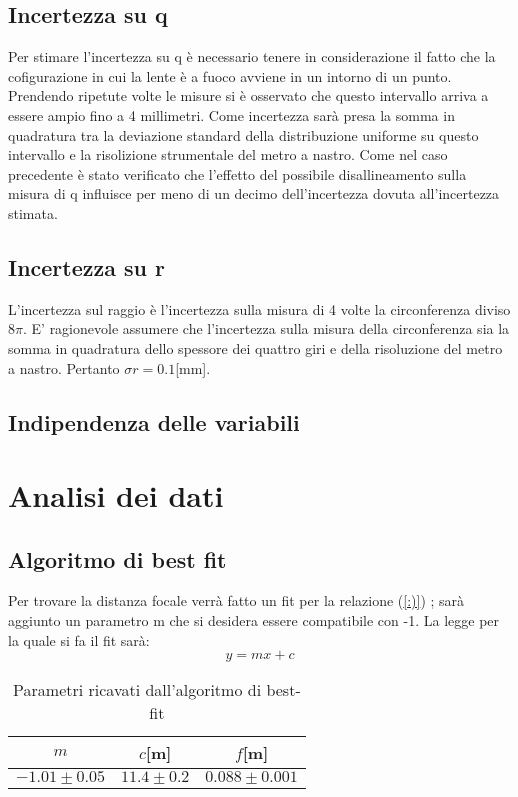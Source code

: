 \documentclass{article}
\begin{document}
\subsection{Incertezza su q}

Per stimare l'incertezza su q è necessario tenere in considerazione il fatto che la cofigurazione in cui la lente è a fuoco avviene in un intorno di un punto.
Prendendo ripetute volte le misure si è osservato che questo intervallo arriva a essere ampio fino a 4 millimetri.
Come incertezza sarà presa la somma in quadratura tra la deviazione standard della distribuzione uniforme su questo intervallo e la risolizione strumentale del metro a nastro.
Come nel caso precedente è stato verificato che l'effetto del possibile disallineamento sulla misura di q influisce per meno di un decimo dell'incertezza dovuta all'incertezza stimata.

\subsection{Incertezza su r}
L'incertezza sul raggio è l'incertezza sulla misura di 4 volte la circonferenza diviso $8\pi$.
E' ragionevole assumere che l'incertezza sulla misura della circonferenza sia la somma in quadratura dello spessore dei quattro giri e della risoluzione del metro a nastro.
Pertanto $\sigma r= 0.1$[mm].

\subsection{Indipendenza delle variabili}

\section{Analisi dei dati}
\subsection{Algoritmo di best fit}
Per trovare la distanza focale verrà fatto un fit per la relazione (\ref{:)}) ; sarà aggiunto un parametro m che si desidera essere compatibile con -1.
La legge per la quale si fa il fit sarà:
\begin{equation}
	y=mx+c
	\label{fiteq}
\end{equation}


		\begin{table}
			\centering
				\begin{tabular}{|c|c|c|}

					\hline
						$m$  & $c$[m] & $f$[m]\\
					\hline
			
						$-1.01\pm0.05$ & $11.4\pm0.2$ & $0.088\pm0.001$\\
					\hline
			
				\end{tabular}
					\caption{ Parametri ricavati dall'algoritmo di best-fit}
		
		\end{table}		
\end{document}
